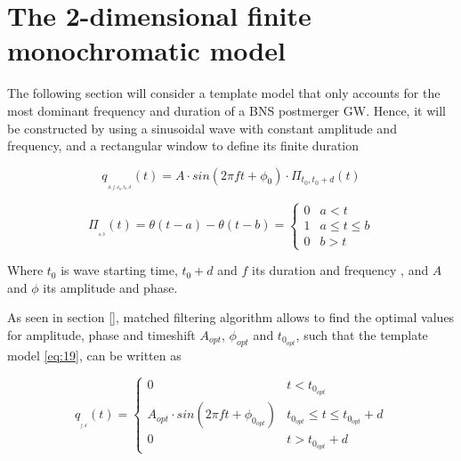 \FloatBarrier


\section{The 2-dimensional finite monochromatic model}\label{2dsearch}

The following section will consider a template model that only accounts for the most dominant frequency and duration of a BNS postmerger GW. Hence, it will be constructed by using a sinusoidal wave with constant amplitude and frequency, and a rectangular window to define its finite duration 


\begin{equation}\label{eq:19}
q_{_{_{A, f, \phi_0, t_{0}, d}}}(t) =A \cdot sin(2\pi f t + \phi_0) \cdot \Pi_{t_{0},t_{0} + d}(t)
\end{equation}


\begin{equation}\label{eq:18}
\Pi_{_{_{a,b}}}(t) = \theta(t-a)-\theta(t-b) = 
\begin{cases} 
      0 & a<t \\
      1 & a \leq t\leq b \\
      0 & b>t
   \end{cases}
\end{equation}

Where $t_0$ is wave starting time, $t_0+d$ and $f$ its duration and frequency , and $A$ and $\phi$ its amplitude and phase.


As seen in section \ref{}, matched filtering algorithm allows to find the optimal values for amplitude, phase and timeshift $A_{opt}$, $\phi_{opt}$ and $t_{0_{opt}}$, such that the template model \ref{eq:19}, can be written as

\begin{equation}\label{eq:20}
q_{_{_{f,d}}}(t) =
\begin{cases} 
      0 & t<t_{0_{opt}} \\
      A_{opt} \cdot sin(2\pi f t + \phi_{0_{opt}}) & t_{0_{opt}} \leq t\leq t_{0_{opt}}+d \\
      0 & t>t_{0_{opt}}+d
   \end{cases}
\end{equation}

